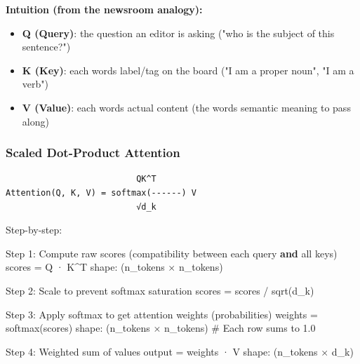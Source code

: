 \documentclass[11pt]{article}
\providecommand{\tightlist}{\setlength{\itemsep}{1pt}\setlength{\parskip}{0pt}}
\newenvironment{Shaded}{\begin{snugshade}}{\end{snugshade}}
\newcommand{\BuiltInTok}[1]{\textcolor[rgb]{0.50,0.55,0.55}{#1}}
\newcommand{\CommentTok}[1]{\textcolor[rgb]{0.48,0.49,0.49}{#1}}
\newcommand{\DecValTok}[1]{\textcolor[rgb]{0.96,0.45,0.00}{#1}}
\newcommand{\KeywordTok}[1]{\textcolor[rgb]{0.81,0.81,0.76}{\textbf{#1}}}
\newcommand{\NormalTok}[1]{\textcolor[rgb]{0.81,0.81,0.76}{#1}}
\newcommand{\OperatorTok}[1]{\textcolor[rgb]{0.81,0.81,0.76}{#1}}
\begin{document}
\textbf{Intuition (from the newsroom analogy):}

\begin{itemize}
\tightlist
\item
  \textbf{Q (Query)}: the question an editor is asking ("who is the subject of this sentence?")
\item
  \textbf{K (Key)}: each word\textquotesingle s label/tag on the board ("I am a proper noun", "I am a verb")
\item
  \textbf{V (Value)}: each word\textquotesingle s actual content (the word\textquotesingle s semantic meaning to pass along)
\end{itemize}

\subsubsection{Scaled Dot-Product Attention}\label{scaled-dot-product-attention}

\setcodelang{}

\begin{verbatim}
                          QK^T
Attention(Q, K, V) = softmax(------) V
                          √d_k
\end{verbatim}

Step-by-step:


\begin{Shaded}
\begin{Highlighting}[]
\NormalTok{Step }\DecValTok{1}\NormalTok{: Compute raw scores (compatibility between each query }\KeywordTok{and} \BuiltInTok{all}\NormalTok{ keys)}
\NormalTok{        scores }\OperatorTok{=}\NormalTok{ Q · K}\OperatorTok{\^{}}\NormalTok{T          shape: (n\_tokens × n\_tokens)}

\NormalTok{Step }\DecValTok{2}\NormalTok{: Scale to prevent softmax saturation}
\NormalTok{        scores }\OperatorTok{=}\NormalTok{ scores }\OperatorTok{/}\NormalTok{ sqrt(d\_k)}

\NormalTok{Step }\DecValTok{3}\NormalTok{: Apply softmax to get attention weights (probabilities)}
\NormalTok{        weights }\OperatorTok{=}\NormalTok{ softmax(scores)   shape: (n\_tokens × n\_tokens)}
        \CommentTok{\# Each row sums to 1.0}

\NormalTok{Step }\DecValTok{4}\NormalTok{: Weighted }\BuiltInTok{sum}\NormalTok{ of values}
\NormalTok{        output }\OperatorTok{=}\NormalTok{ weights · V        shape: (n\_tokens × d\_k)}
\end{Highlighting}
\end{Shaded}
\end{document}
